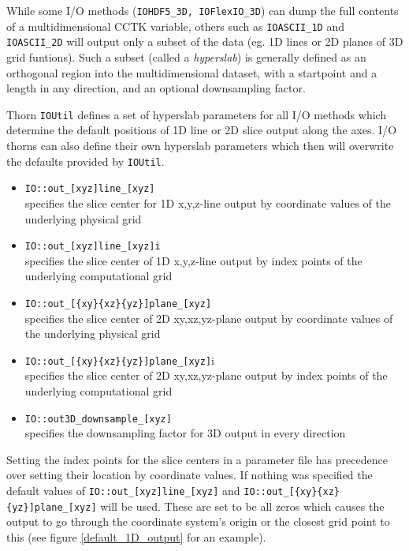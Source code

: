 \documentclass{article}
\begin{document}
While some I/O methods ({\tt IOHDF5\_3D, IOFlexIO\_3D}) can dump the full
contents of a multidimensional CCTK variable, others such as
{\tt IOASCII\_1D} and {\tt IOASCII\_2D} will output only a subset of the data
(eg. 1D lines or 2D planes of 3D grid funtions).
Such a subset (called a {\it hyperslab}) is generally defined as an orthogonal
region into the multidimensional dataset, with a startpoint and a length in any
direction, and an optional downsampling factor.

Thorn {\tt IOUtil} defines a set of hyperslab parameters for all
I/O methods which determine the default positions of 1D line or 2D slice output
along the axes. I/O thorns can also define their own hyperslab parameters
which then will overwrite the defaults provided by {\tt IOUtil}.

\begin{itemize}
  \item {\tt IO::out\_[xyz]line\_[xyz]}\\
    specifies the slice center for 1D x,y,z-line output by coordinate values
    of the underlying physical grid
  \item {\tt IO::out\_[xyz]line\_[xyz]i}\\
    specifies the slice center of 1D x,y,z-line output by index points
    of the underlying computational grid
  \item {\tt IO::out\_[\{xy\}\{xz\}\{yz\}]plane\_[xyz]}\\
    specifies the slice center of 2D xy,xz,yz-plane output by coordinate values
    of the underlying physical grid
  \item {\tt IO::out\_[\{xy\}\{xz\}\{yz\}]plane\_[xyz]}i\\
    specifies the slice center of 2D xy,xz,yz-plane output by index points
    of the underlying computational grid
  \item {\tt IO::out3D\_downsample\_[xyz]}\\
    specifies the downsampling factor for 3D output in every direction
\end{itemize}

Setting the index points for the slice centers in a parameter file
has precedence over setting their location by coordinate values.
If nothing was specified the default values of {\tt IO::out\_[xyz]line\_[xyz]}
and {\tt IO::out\_[\{xy\}\{xz\}\{yz\}]plane\_[xyz]} will be used.
These are set to be all zeros which causes the output to go through the
coordinate system's origin or the closest grid point to this (see figure
\ref{default_1D_output} for an example).
\end{document}
